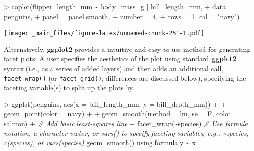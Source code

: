 \documentclass[
]{book}
\newenvironment{Shaded}{\begin{snugshade}}{\end{snugshade}}
\newcommand{\AttributeTok}[1]{\textcolor[rgb]{0.77,0.63,0.00}{#1}}
\newcommand{\CommentTok}[1]{\textcolor[rgb]{0.56,0.35,0.01}{\textit{#1}}}
\newcommand{\DecValTok}[1]{\textcolor[rgb]{0.00,0.00,0.81}{#1}}
\newcommand{\FunctionTok}[1]{\textcolor[rgb]{0.00,0.00,0.00}{#1}}
\newcommand{\NormalTok}[1]{#1}
\newcommand{\SpecialCharTok}[1]{\textcolor[rgb]{0.00,0.00,0.00}{#1}}
\newcommand{\StringTok}[1]{\textcolor[rgb]{0.31,0.60,0.02}{#1}}
\begin{document}
\begin{Shaded}
\begin{Highlighting}[]
\SpecialCharTok{\textgreater{}} \FunctionTok{coplot}\NormalTok{(flipper\_length\_mm }\SpecialCharTok{\textasciitilde{}}\NormalTok{ body\_mass\_g }\SpecialCharTok{|}\NormalTok{ bill\_length\_mm, }
\SpecialCharTok{+}        \AttributeTok{data =}\NormalTok{ penguins,}
\SpecialCharTok{+}        \AttributeTok{panel =}\NormalTok{ panel.smooth,}
\SpecialCharTok{+}        \AttributeTok{number =} \DecValTok{4}\NormalTok{, }
\SpecialCharTok{+}        \AttributeTok{rows =} \DecValTok{1}\NormalTok{, }\AttributeTok{col =} \StringTok{"navy"}\NormalTok{)}
\end{Highlighting}
\end{Shaded}

\texttt{[image: \_main\_files/figure-latex/unnamed-chunk-251-1.pdf]}

Alternatively, \textbf{ggplot2} provides a intuitive and easy-to-use method for generating facet plots: A user specifies the aesthetics of the plot using standard \textbf{ggplot2} syntax (i.e., as a series of added layers) and then adds an additional call, \texttt{facet\_wrap()} (or \texttt{facet\_grid()}; differences are discussed below), specifying the faceting variable(s) to split up the plots by.

\begin{Shaded}
\begin{Highlighting}[]
\SpecialCharTok{\textgreater{}} \FunctionTok{ggplot}\NormalTok{(penguins, }\FunctionTok{aes}\NormalTok{(}\AttributeTok{x =}\NormalTok{ bill\_length\_mm, }\AttributeTok{y =}\NormalTok{ bill\_depth\_mm)) }\SpecialCharTok{+}
\SpecialCharTok{+}   \FunctionTok{geom\_point}\NormalTok{(}\AttributeTok{color =} \StringTok{\textquotesingle{}navy\textquotesingle{}}\NormalTok{) }\SpecialCharTok{+}
\SpecialCharTok{+}   \FunctionTok{geom\_smooth}\NormalTok{(}\AttributeTok{method =} \StringTok{\textquotesingle{}lm\textquotesingle{}}\NormalTok{, }\AttributeTok{se =}\NormalTok{ F, }\AttributeTok{color =} \StringTok{\textquotesingle{}salmon\textquotesingle{}}\NormalTok{) }\SpecialCharTok{+} \CommentTok{\# Add basic least{-}squares line}
\SpecialCharTok{+}   \FunctionTok{facet\_wrap}\NormalTok{(}\SpecialCharTok{\textasciitilde{}}\NormalTok{species) }\CommentTok{\# Use formula notation, a character vector, or vars() to specify faceting variables; e.g., \textasciitilde{}species, c(\textquotesingle{}species\textquotesingle{}), or vars(species)}
\StringTok{\textasciigrave{}}\AttributeTok{geom\_smooth()}\StringTok{\textasciigrave{}}\NormalTok{ using formula }\StringTok{\textquotesingle{}y \textasciitilde{} x\textquotesingle{}}
\end{Highlighting}
\end{Shaded}
\end{document}
